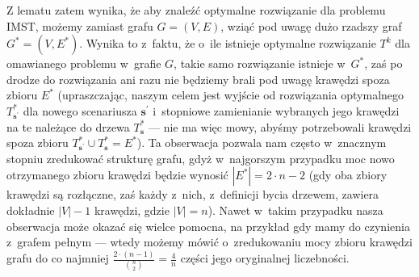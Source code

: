Z lematu zatem wynika, że aby znaleźć optymalne rozwiązanie dla problemu \textsc{IMST}, możemy zamiast grafu $G = \left( V, E \right)$, wziąć pod uwagę dużo rzadszy graf $G^{\ast} = \left( V, E^{\ast} \right)$.
Wynika to z~faktu, że o~ile istnieje optymalne rozwiązanie $T^{k}$ dla omawianego problemu w~grafie $G$, takie samo rozwiązanie istnieje w~$G^{\ast}$, zaś po drodze do rozwiązania ani razu nie będziemy brali pod uwagę krawędzi spoza zbioru $E^{\ast}$ (upraszczając, naszym celem jest wyjście od rozwiązania optymalnego $T^{\ast}_{\textbf{s}^{\prime}}$ dla nowego scenariusza $\textbf{s}^{\prime}$ i~stopniowe zamienianie wybranych jego krawędzi na te należące do drzewa $T^{\ast}_{\textbf{s}}$ --- nie ma więc mowy, abyśmy potrzebowali krawędzi spoza zbioru $T^{\ast}_{\textbf{s}^{\prime}} \cup T^{\ast}_{\textbf{s}} = E^{\ast}$).
Ta obserwacja pozwala nam często w~znacznym stopniu zredukować strukturę grafu, gdyż w~najgorszym przypadku moc nowo otrzymanego zbioru krawędzi będzie wynosić $\left| E^{\ast} \right| = 2 \cdot n - 2$ (gdy oba zbiory krawędzi są rozłączne, zaś każdy z~nich, z~definicji bycia drzewem, zawiera dokładnie $\left| V \right| - 1$ krawędzi, gdzie $\left| V \right| = n$).
Nawet w~takim przypadku nasza obserwacja może okazać się wielce pomocna, na przykład gdy mamy do czynienia z~grafem pełnym --- wtedy możemy mówić o~zredukowaniu mocy zbioru krawędzi grafu do co najmniej $\frac{2 \cdot \left( n - 1 \right)}{\binom{n}{2}} = \frac{4}{n}$ części jego oryginalnej liczebności.

